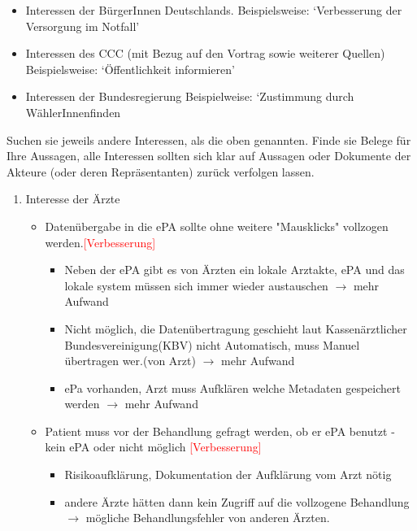 \documentclass[a4paper]{assignment}
\begin{document}
\begin{problemlist}
\begin{itemize}

\item Interessen der BürgerInnen Deutschlands. Beispielsweise: ‘Verbesserung der Versorgung im Notfall’

\item Interessen des CCC (mit Bezug auf den Vortrag sowie weiterer Quellen) Beispielsweise: ‘Öffentlichkeit informieren’

\item Interessen der Bundesregierung Beispielweise: ‘Zustimmung durch WählerInnenfinden
\end{itemize}

Suchen sie jeweils andere Interessen, als die oben genannten.
Finde sie Belege für Ihre Aussagen, alle Interessen sollten sich klar auf Aussagen oder
Dokumente der Akteure (oder deren Repräsentanten) zurück verfolgen lassen.


\begin{enumerate}

\item Interesse der Ärzte\cite{ccc-epa}

\begin{itemize}
\item Datenübergabe in die ePA sollte ohne weitere "Mausklicks" vollzogen werden.\textcolor{red}{[Verbesserung]}

\begin{itemize}
\item Neben der ePA gibt es von Ärzten ein lokale Arztakte, ePA und das lokale system müssen sich immer wieder austauschen $\rightarrow$ mehr Aufwand

\item Nicht möglich, die Datenübertragung geschieht laut Kassenärztlicher Bundesvereinigung(KBV) nicht Automatisch, muss Manuel übertragen wer.(von Arzt) $\rightarrow$ mehr Aufwand

\item ePa vorhanden, Arzt muss Aufklären welche Metadaten gespeichert werden $\rightarrow$ mehr Aufwand
\end{itemize}

\item Patient muss vor der Behandlung gefragt werden, ob er ePA benutzt - kein ePA oder nicht möglich \textcolor{red}{[Verbesserung]}
\begin{itemize}
\item Risikoaufklärung, Dokumentation der Aufklärung vom Arzt nötig
\item andere Ärzte hätten dann kein Zugriff auf die vollzogene Behandlung $\rightarrow$ mögliche Behandlungsfehler von anderen Ärzten.
\end{itemize}


\end{itemize}
\end{enumerate}
\end{problemlist}
\end{document}
